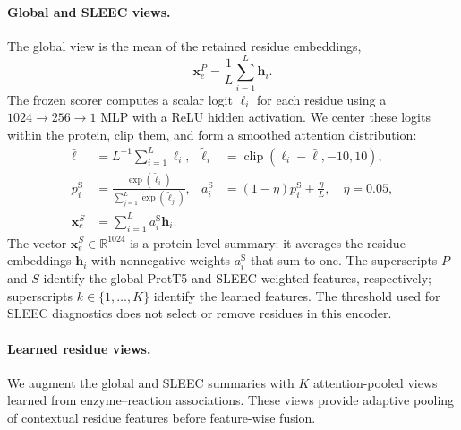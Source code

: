 \paragraph{Global and SLEEC views.}
The global view is the mean of the retained residue embeddings,
\begin{equation}
  \mathbf{x}_e^{P}=\frac{1}{L}\sum_{i=1}^{L}\mathbf{h}_i.
  \label{eq:v4-global}
\end{equation}
The frozen scorer computes a scalar logit $\ell_i$ for each residue using a
$1024\!\to\!256\!\to\!1$ MLP with a ReLU hidden activation. We center these
logits within the protein, clip them, and form a smoothed attention distribution:
\begin{align}
  \bar\ell &= L^{-1}\sum_{i=1}^{L}\ell_i,
  & \tilde\ell_i &= \operatorname{clip}(\ell_i-\bar\ell,-10,10),\\
  p_i^{\mathrm{S}} &= \frac{\exp(\tilde\ell_i)}{\sum_{j=1}^{L}\exp(\tilde\ell_j)},
  & a_i^{\mathrm{S}} &= (1-\eta)p_i^{\mathrm{S}}+\frac{\eta}{L},
  \quad \eta=0.05,\\
  \mathbf{x}_e^{S} &= \sum_{i=1}^{L}a_i^{\mathrm{S}}\mathbf{h}_i.
  \label{eq:v4-sleec}
\end{align}
The vector $\mathbf{x}_e^{S}\in\mathbb R^{1024}$ is a protein-level summary:
it averages the residue embeddings $\mathbf h_i$ with nonnegative weights
$a_i^{\mathrm S}$ that sum to one. The superscripts $P$ and $S$ identify
the global ProtT5 and SLEEC-weighted features, respectively; superscripts
$k\in\{1,\ldots,K\}$ identify the learned features. The threshold used for
SLEEC diagnostics does not select or remove residues in this encoder.

\paragraph{Learned residue views.}
We augment the global and SLEEC summaries with $K$ attention-pooled views
learned from enzyme--reaction associations. These views provide adaptive
pooling of contextual residue features before feature-wise fusion.


